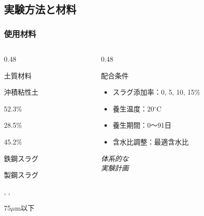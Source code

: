 \documentclass[unicode, 9pt, aspectratio=43]{beamer}
\begin{document}
\begin{refsection}
  \section{実験方法と材料}

  \begin{frame}
    \frametitle{使用材料}
    \begin{columns}
      \begin{column}{0.48\linewidth}
        \begin{block}{土質材料}
          \begin{description}[含水比]
            \item[種類] 沖積粘性土
            \item[液性限界] 52.3\%
            \item[塑性限界] 28.5\%
            \item[含水比] 45.2\%
          \end{description}
        \end{block}

        \begin{block}{鉄鋼スラグ}
          \begin{description}[粒度]
            \item[種類] 製鋼スラグ
            \item[主成分] , , 
            \item[粒度] 75\(\mu \)m以下
          \end{description}
        \end{block}
      \end{column}

      \begin{column}{0.48\linewidth}
        \begin{alertblock}{配合条件}
          \begin{itemize}
            \item スラグ添加率：0, 5, 10, 15\%
            \item 養生温度：20\(^\circ \)C
            \item 養生期間：0〜91日
            \item 含水比調整：最適含水比
          \end{itemize}
        \end{alertblock}

        \vspace{1em}

        \begin{exampleblock}{}
          \centering
          \small
          \emph{体系的な}\\
          \emph{実験計画}
        \end{exampleblock}
      \end{column}
    \end{columns}
  \end{frame}


\end{refsection}
\end{document}
